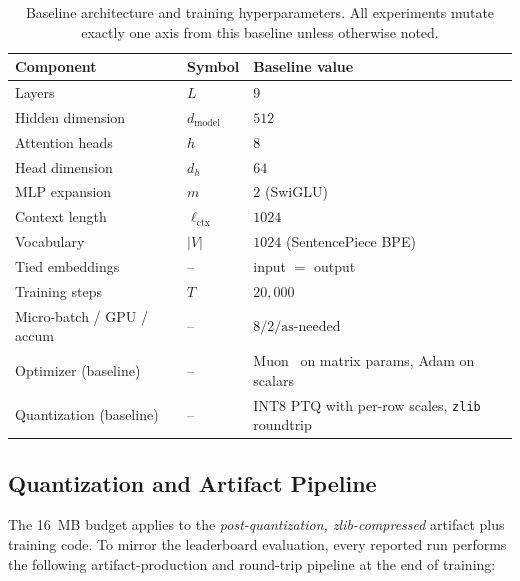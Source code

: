 \documentclass[11pt, letterpaper]{article}
\begin{document}
\begin{table}[H]
\centering
\small
\begin{tabular}{@{}lll@{}}
\toprule
\textbf{Component} & \textbf{Symbol} & \textbf{Baseline value} \\
\midrule
Layers                    & $L$                  & $9$ \\
Hidden dimension          & $d_{\text{model}}$   & $512$ \\
Attention heads           & $h$                  & $8$ \\
Head dimension            & $d_h$                & $64$ \\
MLP expansion             & $m$                  & $2$ (SwiGLU) \\
Context length            & $\ell_{\text{ctx}}$  & $1024$ \\
Vocabulary                & $|V|$                & $1024$ (SentencePiece BPE) \\
Tied embeddings           & --                   & input $=$ output \\
Training steps            & $T$                  & $20{,}000$ \\
Micro-batch / GPU / accum & --                   & $8 / 2 / \text{as-needed}$ \\
Optimizer (baseline)      & --                   & Muon~\cite{muon2024} on matrix params, Adam on scalars \\
Quantization (baseline)   & --                   & INT8 PTQ with per-row scales, \texttt{zlib} roundtrip \\
\bottomrule
\end{tabular}
\caption{Baseline architecture and training hyperparameters. All
experiments mutate exactly one axis from this baseline unless
otherwise noted.}
\label{tab:arch}
\end{table}

\subsection{Quantization and Artifact Pipeline}

The 16~MB budget applies to the \emph{post-quantization, zlib-compressed}
artifact plus training code. To mirror the leaderboard
evaluation, every reported run performs the following
artifact-production and round-trip pipeline at the end of
training:
\end{document}
